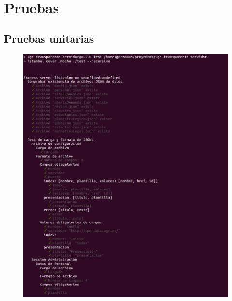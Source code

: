 \chapter{Pruebas}

\section{Pruebas unitarias}

\begin{figure}[!ht]
	\begin{center}
		\includegraphics[width=1\textwidth]{../images/tests_unitarios_01.png}
		\caption{}
		\label{fig:tests_unitarios_01}
	\end{center}
\end{figure}

